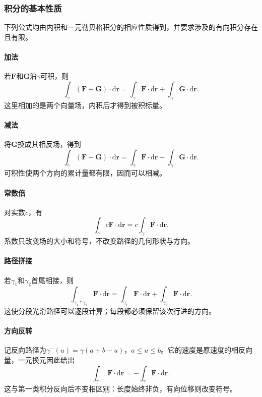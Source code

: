 \subsubsection{积分的基本性质}

下列公式均由内积和一元勒贝格积分的相应性质得到，并要求涉及的有向积分存在且有限。

\paragraph{加法}

若$\bm F$和$\bm G$沿$\gamma$可积，则
\[
 \int_\gamma(\bm F+\bm G)\cdot\mathrm d\bm r
 =\int_\gamma\bm F\cdot\mathrm d\bm r+\int_\gamma\bm G\cdot\mathrm d\bm r.
\]
这里相加的是两个向量场，内积后才得到被积标量。

\paragraph{减法}

将$\bm G$换成其相反场，得到
\[
 \int_\gamma(\bm F-\bm G)\cdot\mathrm d\bm r
 =\int_\gamma\bm F\cdot\mathrm d\bm r-\int_\gamma\bm G\cdot\mathrm d\bm r.
\]
可积性使两个方向的累计量都有限，因而可以相减。

\paragraph{常数倍}

对实数$c$，有
\[
 \int_\gamma c\bm F\cdot\mathrm d\bm r
 =c\int_\gamma\bm F\cdot\mathrm d\bm r.
\]
系数只改变场的大小和符号，不改变路径的几何形状与方向。

\paragraph{路径拼接}

若$\gamma_1$和$\gamma_2$首尾相接，则
\[
 \int_{\gamma_1*\gamma_2}\bm F\cdot\mathrm d\bm r
 =\int_{\gamma_1}\bm F\cdot\mathrm d\bm r
 +\int_{\gamma_2}\bm F\cdot\mathrm d\bm r.
\]
这使分段光滑路径可以逐段计算；每段都必须保留该次行进的方向。

\paragraph{方向反转}

记反向路径为$\gamma^{-}(u)=\gamma(a+b-u)$，$a\leq u\leq b$。它的速度是原速度的相反向量，一元换元因此给出
\[
 \int_{\gamma^{-}}\bm F\cdot\mathrm d\bm r
 =-\int_\gamma\bm F\cdot\mathrm d\bm r.
\]
这与第一类积分反向后不变相区别：长度始终非负，有向位移则改变符号。

